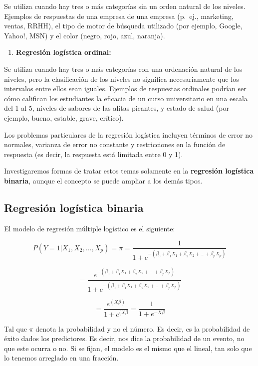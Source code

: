 \documentclass[
  letterpaper,
  DIV=11,
  numbers=noendperiod]{scrartcl}
\providecommand{\tightlist}{%
  \setlength{\itemsep}{0pt}\setlength{\parskip}{0pt}}\usepackage{longtable,booktabs,array}
\begin{document}
Se utiliza cuando hay tres o más categorías sin un orden natural de los
niveles. Ejemplos de respuestas de una empresa de una empresa (p.~ej.,
marketing, ventas, RRHH), el tipo de motor de búsqueda utilizado (por
ejemplo, Google, Yahoo!, MSN) y el color (negro, rojo, azul, naranja).

\begin{enumerate}
\def\labelenumi{\arabic{enumi}.}
\setcounter{enumi}{2}
\tightlist
\item
  \textbf{Regresión logística ordinal:}
\end{enumerate}

Se utiliza cuando hay tres o más categorías con una ordenación natural
de los niveles, pero la clasificación de los niveles no significa
necesariamente que los intervalos entre ellos sean iguales. Ejemplos de
respuestas ordinales podrían ser cómo califican los estudiantes la
eficacia de un curso universitario en una escala del 1 al 5, niveles de
sabores de las alitas picantes, y estado de salud (por ejemplo, bueno,
estable, grave, crítico).

Los problemas particulares de la regresión logística incluyen términos
de error no normales, varianza de error no constante y restricciones en
la función de respuesta (es decir, la respuesta está limitada entre 0 y
1).

Investigaremos formas de tratar estos temas solamente en la
\textbf{regresión logística binaria}, aunque el concepto se puede
ampliar a los demás tipos.

\hypertarget{regresiuxf3n-loguxedstica-binaria}{%
\subsection{Regresión logística
binaria}\label{regresiuxf3n-loguxedstica-binaria}}

El modelo de regresión múltiple logístico es el siguiente:

\[
P(Y = 1|X_1, X_2, ..., X_p) =\pi= \frac{1}{1+e^{-(\beta_0 + \beta_1X_1 + \beta_2X_2 + ... + \beta_pX_p)}}
\]

\[
=\frac{e^{-(\beta_0 + \beta_1X_1 + \beta_2X_2 + ... + \beta_pX_p)}}{1+e^{-(\beta_0 + \beta_1X_1 + \beta_2X_2 + ... + \beta_pX_p)}}
\]

\[
=\frac{e^{(X\beta)}}{1+e^{(X\beta}} = \frac{1}{1+e^{-X\beta}}
\]

Tal que \(\pi\) denota la probabilidad y no el número. Es decir, es la
probabilidad de éxito dados los predictores. Es decir, nos dice la
probabilidad de un evento, no que este ocurra o no. Si se fijan, el
modelo es el mismo que el lineal, tan solo que lo tenemos arreglado en
una fracción.
\end{document}
